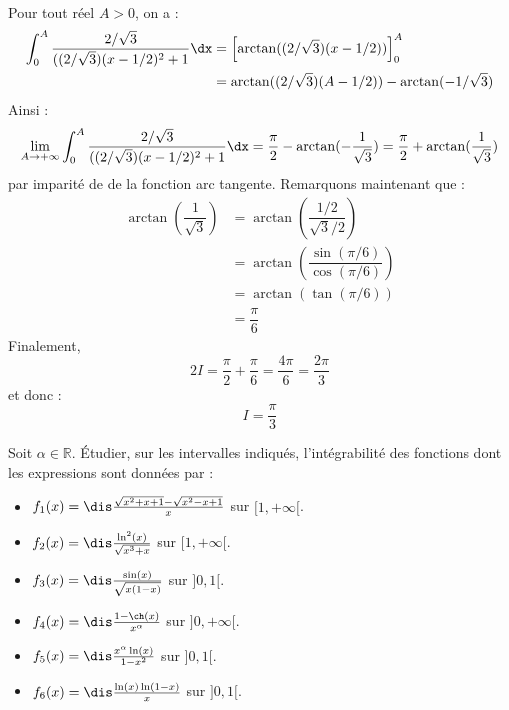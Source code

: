 \documentclass[a4paper,10pt]{report}
\begin{document}
\begin{enumerate}
\begin{align*}
\end{align*}
Pour tout réel $A >0$, on a :
\begin{align*}
\int_{0}^{A} \frac{2/\sqrt{3}}{((2/ \sqrt{3})(x-1/2)^2+1} \dx & = \left[ \arctan((2/ \sqrt{3})(x-1/2)) \right]_0^A \\
& = \arctan((2/ \sqrt{3})(A-1/2)) - \arctan(- 1/\sqrt{3})
\end{align*}
Ainsi :
$$ \lim_{A \rightarrow + \infty} \int_{0}^{A} \frac{2/\sqrt{3}}{((2/ \sqrt{3})(x-1/2)^2+1} \dx = \dfrac{\pi}{2} - \arctan(- \dfrac{1}{\sqrt{3}}) = \dfrac{\pi}{2} + \arctan(\dfrac{1}{\sqrt{3}})$$
par imparité de de la fonction arc tangente. Remarquons maintenant que :
\begin{align*}
\arctan \left(\dfrac{1}{\sqrt{3}}\right) & = \arctan\left(\dfrac{1/2}{\sqrt{3}/2}\right) \\
& =  \arctan \left(\dfrac{\sin(\pi/6)}{\cos(\pi/6)}\right) \\
& = \arctan\left(\tan(\pi/6)\right) \\
& = \dfrac{\pi}{6}
\end{align*}
Finalement,
$$ 2I = \dfrac{\pi}{2} + \dfrac{\pi}{6} = \dfrac{4\pi}{6} = \dfrac{2\pi}{3}$$
et donc :
$$ I = \dfrac{\pi}{3}$$

\end{enumerate} 

\begin{Exa} Soit $\alpha \in \mathbb{R}$. Étudier, sur les intervalles indiqués, l'int\'egrabilit\'e des fonctions dont les expressions sont données par :
\begin{multicols}{2}
\begin{itemize}
\item $f_1(x)=\dis\frac{\sqrt{x^2+x+1}-\sqrt{x^2-x+1}}{x}$ sur \newline $[1,+\infty[$.
\item $f_2(x)=\dis\frac{\ln^2(x)}{\sqrt{x^3+x}}$ sur $[1,+\infty[$.
\item $f_3(x)=\dis\frac{\sin(x)}{\sqrt{x(1-x)}}$ sur $]0,1[$.
\columnbreak
\item $f_4(x)=\dis\frac{1-\ch(x)}{x^{\alpha}}$ sur $]0,+\infty[$.
\item $f_5(x)=\dis\frac{x^{\alpha}\ln(x)}{1-x^2}$ sur $]0,1[$.
\item $f_6(x)=\dis\frac{\ln(x)\ln(1-x)}{x}$ sur $]0,1[$.
\end{itemize}
\end{multicols}

\vspace{0.1cm}
\end{Exa}
\end{document}
